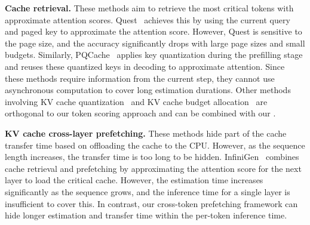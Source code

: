 \textbf{Cache retrieval.} These methods aim to retrieve the most critical tokens with approximate attention scores.
Quest~\citep{tang2024quest} achieves this by using the current query and paged key to approximate the attention score. However, Quest is sensitive to the page size, and the accuracy significantly drops with large page sizes and small budgets. 
Similarly, PQCache~\citep{zhang2024pqcache} applies key quantization during the prefilling stage and reuses these quantized keys in decoding to approximate attention.
Since these methods require information from the current step, they cannot use asynchronous computation to cover long estimation durations. 
Other methods involving KV cache quantization~\citep{liu2024kivi, hooper2024kvquant, zhang2024qhitter} and KV cache budget allocation~\citep{cai2024pyramidkv, yang2024pyramidinfer, feng2024adakv} are orthogonal to our token scoring approach and can be combined with our \ours.

\textbf{KV cache cross-layer prefetching.} These methods hide part of the cache transfer time based on offloading the cache to the CPU. However, as the sequence length increases, the transfer time is too long to be hidden.
InfiniGen~\citep{lee2024infinigen} combines cache retrieval and prefetching by approximating the attention score for the next layer to load the critical cache.
However, the estimation time increases significantly as the sequence grows, and the inference time for a single layer is insufficient to cover this. 
In contrast, our cross-token prefetching framework can hide longer estimation and transfer time within the per-token inference time.
